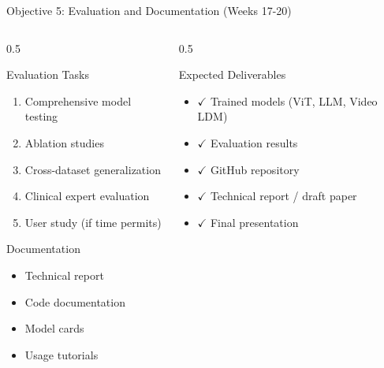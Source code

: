 \documentclass[aspectratio=169]{beamer}
\begin{document}
\begin{frame}{Objective 5: Evaluation and Documentation (Weeks 17-20)}
    \begin{columns}
        \begin{column}{0.5\textwidth}
            \begin{block}{Evaluation Tasks}
                \begin{enumerate}
                    \item Comprehensive model testing
                    \item Ablation studies
                    \item Cross-dataset generalization
                    \item Clinical expert evaluation
                    \item User study (if time permits)
                \end{enumerate}
            \end{block}
            
            \begin{block}{Documentation}
                \begin{itemize}
                    \item Technical report
                    \item Code documentation
                    \item Model cards
                    \item Usage tutorials
                \end{itemize}
            \end{block}
        \end{column}
        \begin{column}{0.5\textwidth}
            \begin{block}{Expected Deliverables}
                \begin{itemize}
                    \item $\checkmark$ Trained models (ViT, LLM, Video LDM)
                    \item $\checkmark$ Evaluation results
                    \item $\checkmark$ GitHub repository
                    \item $\checkmark$ Technical report / draft paper
                    \item $\checkmark$ Final presentation
                \end{itemize}
            \end{block}
            

\end{column}
\end{columns}
\end{frame}
\end{document}
